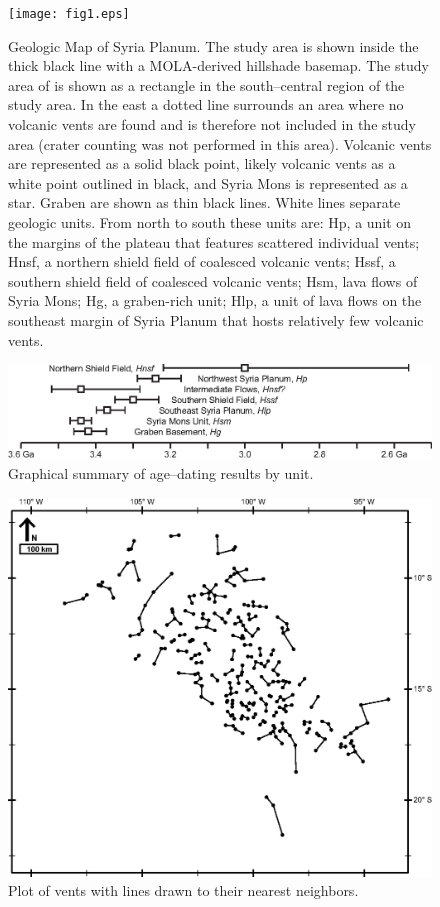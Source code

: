 \documentclass[preprint,review,authoryear,12pt]{elsarticle}
\begin{document}
\begin{figure}
\noindent\texttt{[image: fig1.eps]}
\caption{Geologic Map of Syria Planum. The study area is shown inside the thick black line with a MOLA-derived hillshade basemap. The study area of \citet{Baptista2008} is shown as a rectangle in the south--central region of the study area. In the east a dotted line surrounds an area where no volcanic vents are found and is therefore not included in the study area (crater counting was not performed in this area). Volcanic vents are represented as a solid black point, likely volcanic vents as a white point outlined in black, and Syria Mons is represented as a star. Graben are shown as thin black lines. White lines separate geologic units. From north to south these units are: Hp, a unit on the margins of the plateau that features scattered individual vents; Hnsf, a northern shield field of coalesced volcanic vents; Hssf, a southern shield field of coalesced volcanic vents; Hsm, lava flows of Syria Mons; Hg, a graben-rich unit; Hlp, a unit of lava flows on the southeast margin of Syria Planum that hosts relatively few volcanic vents.}
\label{fig-geomap}
\end{figure}

\begin{figure}
\noindent\includegraphics{fig2.eps}
\caption{Graphical summary of age--dating results by unit.}
\label{fig-unitages}
\end{figure}

\begin{figure}
\noindent\includegraphics{fig3.eps}
\caption{Plot of vents with lines drawn to their nearest neighbors.}
\label{fig-nnmap}
\end{figure}
\end{document}
